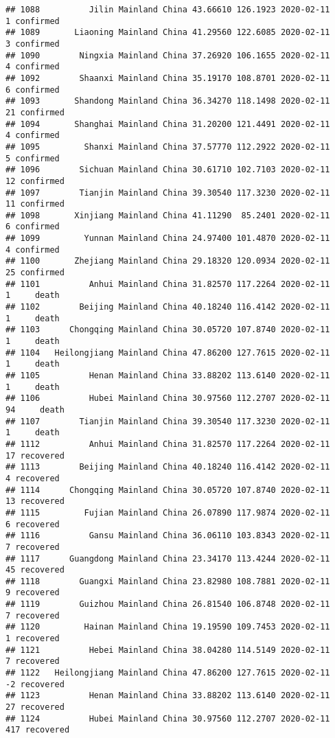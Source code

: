 \documentclass[
]{article}
\begin{document}
\begin{verbatim}
## 1088          Jilin Mainland China 43.66610 126.1923 2020-02-11     1 confirmed
## 1089       Liaoning Mainland China 41.29560 122.6085 2020-02-11     3 confirmed
## 1090        Ningxia Mainland China 37.26920 106.1655 2020-02-11     4 confirmed
## 1092        Shaanxi Mainland China 35.19170 108.8701 2020-02-11     6 confirmed
## 1093       Shandong Mainland China 36.34270 118.1498 2020-02-11    21 confirmed
## 1094       Shanghai Mainland China 31.20200 121.4491 2020-02-11     4 confirmed
## 1095         Shanxi Mainland China 37.57770 112.2922 2020-02-11     5 confirmed
## 1096        Sichuan Mainland China 30.61710 102.7103 2020-02-11    12 confirmed
## 1097        Tianjin Mainland China 39.30540 117.3230 2020-02-11    11 confirmed
## 1098       Xinjiang Mainland China 41.11290  85.2401 2020-02-11     6 confirmed
## 1099         Yunnan Mainland China 24.97400 101.4870 2020-02-11     4 confirmed
## 1100       Zhejiang Mainland China 29.18320 120.0934 2020-02-11    25 confirmed
## 1101          Anhui Mainland China 31.82570 117.2264 2020-02-11     1     death
## 1102        Beijing Mainland China 40.18240 116.4142 2020-02-11     1     death
## 1103      Chongqing Mainland China 30.05720 107.8740 2020-02-11     1     death
## 1104   Heilongjiang Mainland China 47.86200 127.7615 2020-02-11     1     death
## 1105          Henan Mainland China 33.88202 113.6140 2020-02-11     1     death
## 1106          Hubei Mainland China 30.97560 112.2707 2020-02-11    94     death
## 1107        Tianjin Mainland China 39.30540 117.3230 2020-02-11     1     death
## 1112          Anhui Mainland China 31.82570 117.2264 2020-02-11    17 recovered
## 1113        Beijing Mainland China 40.18240 116.4142 2020-02-11     4 recovered
## 1114      Chongqing Mainland China 30.05720 107.8740 2020-02-11    13 recovered
## 1115         Fujian Mainland China 26.07890 117.9874 2020-02-11     6 recovered
## 1116          Gansu Mainland China 36.06110 103.8343 2020-02-11     7 recovered
## 1117      Guangdong Mainland China 23.34170 113.4244 2020-02-11    45 recovered
## 1118        Guangxi Mainland China 23.82980 108.7881 2020-02-11     9 recovered
## 1119        Guizhou Mainland China 26.81540 106.8748 2020-02-11     7 recovered
## 1120         Hainan Mainland China 19.19590 109.7453 2020-02-11     1 recovered
## 1121          Hebei Mainland China 38.04280 114.5149 2020-02-11     7 recovered
## 1122   Heilongjiang Mainland China 47.86200 127.7615 2020-02-11    -2 recovered
## 1123          Henan Mainland China 33.88202 113.6140 2020-02-11    27 recovered
## 1124          Hubei Mainland China 30.97560 112.2707 2020-02-11   417 recovered

\end{verbatim}
\end{document}
